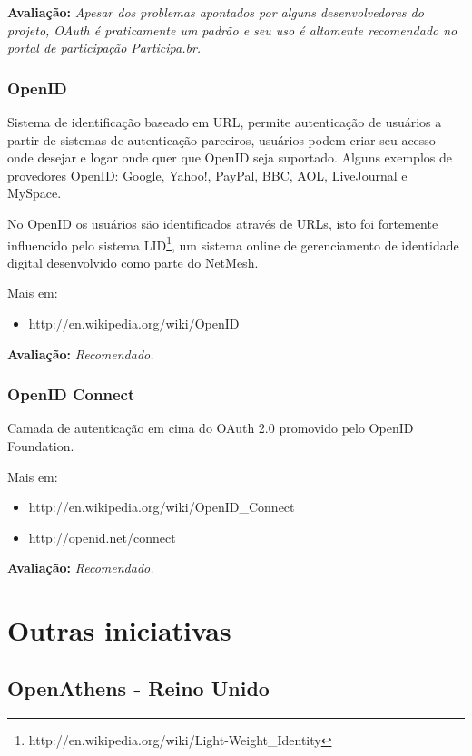 \documentclass[11pt]{article}
\begin{document}
{\bf Avaliação:} {\it Apesar dos problemas apontados por alguns
desenvolvedores do projeto, OAuth é praticamente um padrão e seu uso é
altamente recomendado no portal de participação Participa.br.}

\subsubsection{OpenID}

Sistema de identificação baseado em URL, permite autenticação de usuários a
partir de sistemas de autenticação parceiros, usuários podem criar seu acesso
onde desejar e logar onde quer que OpenID seja suportado. Alguns exemplos de
provedores OpenID: Google, Yahoo!, PayPal, BBC, AOL, LiveJournal e MySpace.

No OpenID os usuários são identificados através de URLs, isto foi fortemente
influencido pelo sistema
LID\footnote{http://en.wikipedia.org/wiki/Light-Weight\_Identity}, um sistema
online de gerenciamento de identidade digital desenvolvido como parte do
NetMesh.

Mais em:
\begin{itemize}
  \item{http://en.wikipedia.org/wiki/OpenID}
\end{itemize}

{\bf Avaliação:} {\it Recomendado.}

\subsubsection{OpenID Connect}

Camada de autenticação em cima do OAuth 2.0 promovido pelo OpenID Foundation.

Mais em:
\begin{itemize}
  \item{http://en.wikipedia.org/wiki/OpenID\_Connect}
  \item{http://openid.net/connect}
\end{itemize}

{\bf Avaliação:} {\it Recomendado.}

\section{Outras iniciativas}

\subsection{OpenAthens - Reino Unido}
\end{document}
